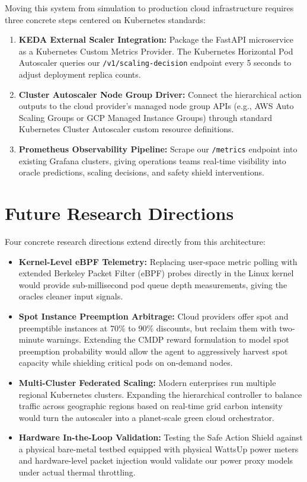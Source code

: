 \documentclass[12pt]{report}
\begin{document}
Moving this system from simulation to production cloud infrastructure requires three concrete steps centered on Kubernetes standards:
\begin{enumerate}
\item \textbf{KEDA External Scaler Integration:} Package the FastAPI microservice as a Kubernetes Custom Metrics Provider. The Kubernetes Horizontal Pod Autoscaler queries our \texttt{/\allowbreak v1/\allowbreak scaling-\allowbreak decision} endpoint every 5 seconds to adjust deployment replica counts.
\item \textbf{Cluster Autoscaler Node Group Driver:} Connect the hierarchical action outputs to the cloud provider's managed node group APIs (e.g., AWS Auto Scaling Groups or GCP Managed Instance Groups) through standard Kubernetes Cluster Autoscaler custom resource definitions.
\item \textbf{Prometheus Observability Pipeline:} Scrape our \texttt{/\allowbreak metrics} endpoint into existing Grafana clusters, giving operations teams real-time visibility into oracle predictions, scaling decisions, and safety shield interventions.
\end{enumerate}

\section{Future Research Directions}

Four concrete research directions extend directly from this architecture:
\begin{itemize}
\item \textbf{Kernel-Level eBPF Telemetry:} Replacing user-space metric polling with extended Berkeley Packet Filter (eBPF) probes directly in the Linux kernel would provide sub-millisecond pod queue depth measurements, giving the oracles cleaner input signals.
\item \textbf{Spot Instance Preemption Arbitrage:} Cloud providers offer spot and preemptible instances at 70\% to 90\% discounts, but reclaim them with two-minute warnings. Extending the CMDP reward formulation to model spot preemption probability would allow the agent to aggressively harvest spot capacity while shielding critical pods on on-demand nodes.
\item \textbf{Multi-Cluster Federated Scaling:} Modern enterprises run multiple regional Kubernetes clusters. Expanding the hierarchical controller to balance traffic across geographic regions based on real-time grid carbon intensity would turn the autoscaler into a planet-scale green cloud orchestrator.
\item \textbf{Hardware In-the-Loop Validation:} Testing the Safe Action Shield against a physical bare-metal testbed equipped with physical WattsUp power meters and hardware-level packet injection would validate our power proxy models under actual thermal throttling.
\end{itemize}
\end{document}
